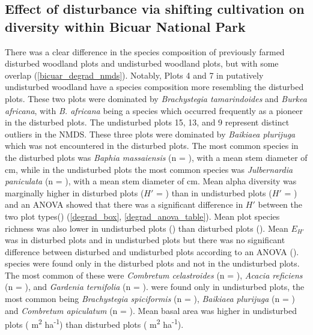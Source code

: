 \documentclass[diversity,article,submit,moreauthors,pdftex]{Definitions/mdpi}
\begin{document}
\subsection{Effect of disturbance via shifting cultivation on diversity within Bicuar National Park}

There was a clear difference in the species composition of previously farmed disturbed woodland plots and undisturbed woodland plots, but with some overlap (\autoref{bicuar_degrad_nmds}). Notably, Plots 4 and 7 in putatively undisturbed woodland have a species composition more resembling the disturbed plots. These two plots were dominated by \textit{Brachystegia tamarindoides} and \textit{Burkea africana}, with \textit{B. africana} being a species which occurred frequently as a pioneer in the disturbed plots. The undisturbed plots 15, 13, and 9 represent distinct outliers in the NMDS. These three plots were dominated by \textit{Baikiaea plurijuga} which was not encountered in the disturbed plots. The most common species in the disturbed plots was \textit{Baphia massaiensis} (n = \nbmdegrad{}), with a mean stem diameter of \bmdbhdegrad{} cm, while in the undisturbed plots the most common species was \textit{Julbernardia paniculata} (n = \njpdegrad{}), with a mean stem diameter of \jpdbhbicuar{} cm. Mean alpha diversity was marginally higher in disturbed plots ($H'$ = \degradshannon{}) than in undisturbed plots ($H'$ = \bicuarsubshannon{}) and an ANOVA showed that there was a significant difference in $H'$ between the two plot types(\lmshannondegrad{}) (\autoref{degrad_box}, \autoref{degrad_anova_table}). Mean plot species richness was also lower in undisturbed plots (\bicuarsubrich{}) than disturbed plots (\degradrich{}). Mean $E_{H'}$ was \degradequit{} in disturbed plots and \bicuarsubequit{} in undisturbed plots but there was no significant difference between disturbed and undisturbed plots according to an ANOVA (\lmequitdegrad{}). \ndegradonlyspecies{} species were found only in the disturbed plots and not in the undisturbed plots. The most common of these were \textit{Combretum celastroides} (n = \nccdegrad{}), \textit{Acacia reficiens} (n = \nvrdegrad{}), and \textit{Gardenia ternifolia} (n = \ngtdegrad{}). \nbigonlyspecies{} were found only in undisturbed plots, the most common being \textit{Brachystegia spiciformis} (n = \nbsbig{}), \textit{Baikiaea plurijuga} (n = \nbpbig{}) and \textit{Combretum apiculatum} (n = \ncabig{}). Mean basal area was higher in undisturbed plots (\bicuarsubba{} m\textsuperscript{2} ha\textsuperscript{-1}) than disturbed plots (\degradba{} m\textsuperscript{2} ha\textsuperscript{-1}). 
\end{document}
